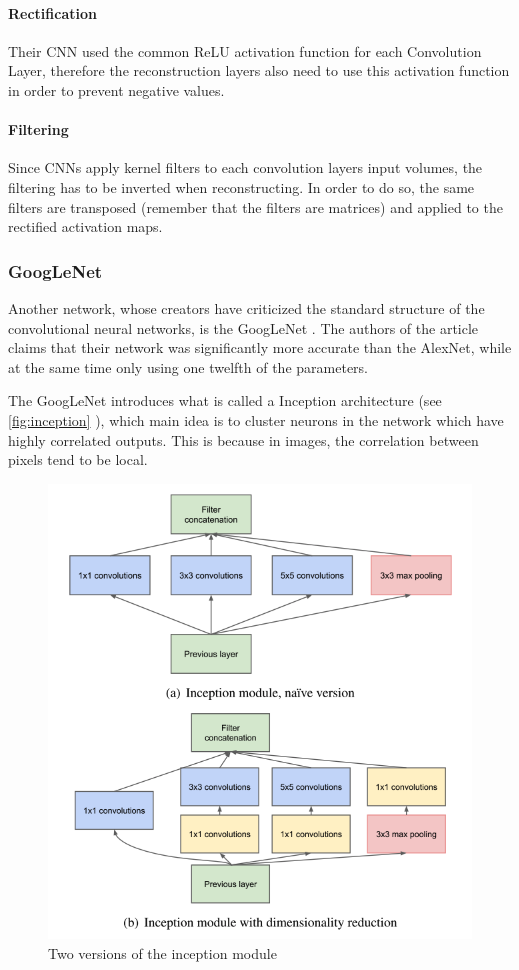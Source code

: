 \paragraph{Rectification}
Their CNN used the common ReLU activation function for each Convolution Layer, therefore the reconstruction layers also need to use this activation function in order to prevent negative values.

\paragraph{Filtering}
Since CNNs apply kernel filters to each convolution layers input volumes, the filtering has to be inverted when reconstructing. In order to do so, the same filters are transposed (remember that the filters are matrices) and applied to the rectified activation maps.

\subsubsection{GoogLeNet}
Another network, whose creators have criticized the standard structure of the convolutional neural networks, is the GoogLeNet \citep{Szegedy2014}. The authors of the article claims that their network was significantly more accurate than the AlexNet, while at the same time only using one twelfth of the parameters.

The GoogLeNet introduces what is called a Inception architecture (see \autoref{fig:inception} ), which main idea is to cluster neurons in the network which have highly correlated outputs. This is because in images, the correlation between pixels tend to be local. 

\begin{figure}[!h]
	\centering
	\includegraphics[scale=0.5]{fig/inception_layer.png}
	\caption{Two versions of the inception module \citep{Szegedy2014}}
	\label{fig:inception}
\end{figure}

